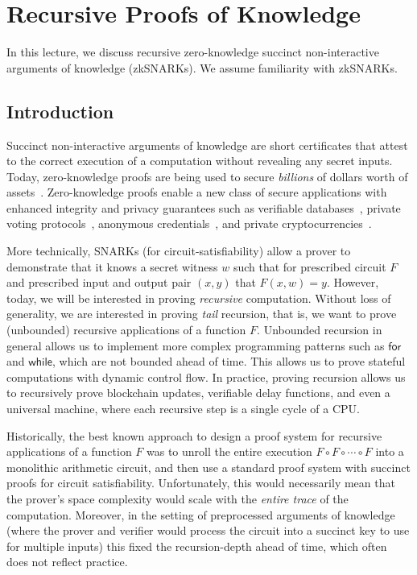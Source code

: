 

\section{Recursive Proofs of Knowledge}

In this lecture, 
we discuss recursive zero-knowledge succinct non-interactive
arguments of knowledge (zkSNARKs).
%
We assume familiarity with zkSNARKs.

\subsection{Introduction}

Succinct non-interactive arguments of knowledge are short certificates that attest to the correct execution of a computation without revealing any secret inputs. 
%
Today, 
zero-knowledge proofs are being used 
to secure \emph{billions} of dollars worth of assets~\cite{zerocash, stark}.
%
Zero-knowledge proofs 
enable a new class of secure applications 
with enhanced integrity and privacy guarantees
such as verifiable databases~\cite{zkvsql, vsql, accountablestorage, integridb},
private voting protocols~\cite{privatevoting},
anonymous credentials~\cite{cinderella, dacreds},
and
private cryptocurrencies~\cite{zerocash, pinocchiocoin, stark}.

More technically, 
SNARKs 
(for circuit-satisfiability)
allow a prover to demonstrate that it knows a secret witness $w$
such that for prescribed circuit $F$ and prescribed input and output pair $(x, y)$ that $F(x, w) = y$.
%
However, today, we will be interested in
proving \emph{recursive} computation. 
Without loss of generality, we are interested in proving \emph{tail}
recursion,
that is, we want to prove
(unbounded) recursive applications 
of a function $F$.
Unbounded recursion
in general allows us to implement more complex programming patterns such as 
$\mathsf{for}$ and $\mathsf{while}$, 
which are not bounded ahead of time.
This allows us to prove stateful computations with dynamic control flow.
In practice, 
proving recursion allows us to recursively prove blockchain updates, verifiable delay functions, and even a universal machine,
where each recursive step is a single cycle of a CPU.


Historically, 
the best known approach to design a proof system for recursive applications of a function $F$ 
was to unroll the entire execution $F \circ F \circ \cdots \circ F$ into a monolithic arithmetic circuit,
and then use a standard proof system with succinct proofs for circuit satisfiability.
%
Unfortunately,
this would necessarily mean that the prover's space complexity would scale with the \emph{entire trace} of the computation.
%
Moreover, 
in the setting of preprocessed arguments of knowledge
(where the prover and verifier would process the circuit into a succinct key to use for multiple inputs)
this fixed the recursion-depth ahead of time,
which often does not reflect practice.

